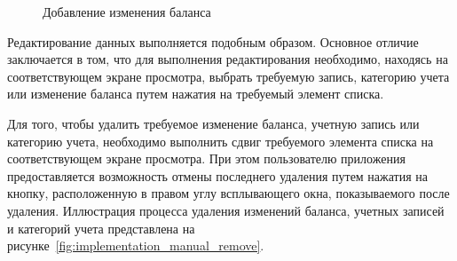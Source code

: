 \begin{figure}[h!]
  \centering
  \caption{Добавление изменения баланса}
  \label{fig:implementation_manual_balance_change}
\end{figure}

Редактирование данных выполняется подобным образом.
Основное отличие заключается в том, что для выполнения редактирования необходимо,
находясь на соответствующем экране просмотра,
выбрать требуемую запись, категорию учета или изменение баланса
путем нажатия на требуемый элемент списка.

Для того, чтобы удалить требуемое изменение баланса,
учетную запись или категорию учета, необходимо
выполнить сдвиг требуемого элемента списка на соответствующем экране просмотра.
При этом пользователю приложения предоставляется возможность отмены последнего
удаления путем нажатия на кнопку, расположенную в правом углу всплывающего
окна, показываемого после удаления.
Иллюстрация процесса удаления изменений баланса, учетных записей и категорий учета
представлена на рисунке~\ref{fig:implementation_manual_remove}.

